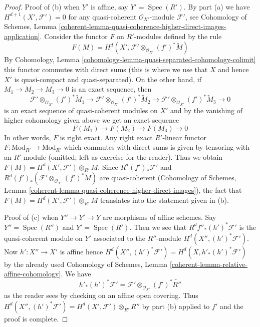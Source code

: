 \documentclass{stacks-project}
\theoremstyle{plain}
\theoremstyle{definition}
\theoremstyle{remark}
\numberwithin{equation}{subsection}
\def\Spec{\mathop{\mathrm{Spec}}}
\begin{document}
\begin{proof}
\medskip\noindent
Proof of (b) when $Y'$ is affine, say $Y' = \Spec(R')$.
By part (a) we have $H^{d + 1}(X', \mathcal{F}') = 0$
for any quasi-coherent $\mathcal{O}_{X'}$-module $\mathcal{F}'$, see
Cohomology of Schemes, Lemma
\ref{coherent-lemma-quasi-coherence-higher-direct-images-application}.
Consider the functor $F$ on $R'$-modules defined by the rule
$$
F(M) = H^d(X', \mathcal{F}' \otimes_{\mathcal{O}_{X'}} (f')^*\widetilde{M})
$$
By Cohomology, Lemma \ref{cohomology-lemma-quasi-separated-cohomology-colimit}
this functor commutes with direct sums (this is where we use that
$X$ and hence $X'$ is quasi-compact and quasi-separated).
On the other hand, if $M_1 \to M_2 \to M_3 \to 0$ is an exact sequence,
then
$$
\mathcal{F}' \otimes_{\mathcal{O}_{X'}} (f')^*\widetilde{M}_1 \to
\mathcal{F}' \otimes_{\mathcal{O}_{X'}} (f')^*\widetilde{M}_2 \to
\mathcal{F}' \otimes_{\mathcal{O}_{X'}} (f')^*\widetilde{M}_3 \to 0
$$
is an exact sequence of quasi-coherent modules on $X'$
and by the vanishing of higher cohomology given above we get an exact sequence
$$
F(M_1) \to F(M_2) \to F(M_3) \to 0
$$
In other words, $F$ is right exact. Any right exact $R'$-linear functor
$F : \text{Mod}_{R'} \to \text{Mod}_{R'}$
which commutes with direct sums is given by tensoring with an $R'$-module
(omitted; left as exercise for the reader).
Thus we obtain $F(M) = H^d(X', \mathcal{F}') \otimes_{R'} M$.
Since $R^d(f')_*\mathcal{F}'$ and
$R^d(f')_*(\mathcal{F}' \otimes_{\mathcal{O}_{X'}} (f')^*\widetilde{M})$
are quasi-coherent (Cohomology of Schemes, Lemma
\ref{coherent-lemma-quasi-coherence-higher-direct-images}),
the fact that $F(M) = H^d(X', \mathcal{F}') \otimes_{R'} M$
translates into the statement given in (b).

\medskip\noindent
Proof of (c) when $Y'' \to Y' \to Y$ are morphisms of affine schemes.
Say $Y'' = \Spec(R'')$ and $Y' = \Spec(R')$.
Then we see that $R^df''_*(h')^*\mathcal{F}'$
is the quasi-coherent module on $Y'$ associated to the $R''$-module
$H^d(X'', (h')^*\mathcal{F}')$. Now $h' : X'' \to X'$ is affine
hence $H^d(X'', (h')^*\mathcal{F}') = H^d(X, h'_*(h')^*\mathcal{F}')$
by the already used
Cohomology of Schemes, Lemma \ref{coherent-lemma-relative-affine-cohomology}.
We have
$$
h'_*(h')^*\mathcal{F}' =
\mathcal{F}' \otimes_{\mathcal{O}_{X'}} (f')^*\widetilde{R''}
$$
as the reader sees by checking on an affine open covering. Thus
$H^d(X'', (h')^*\mathcal{F}') = H^d(X', \mathcal{F}') \otimes_{R'} R''$
by part (b) applied to $f'$ and the proof is complete.
\end{proof}
\end{document}
